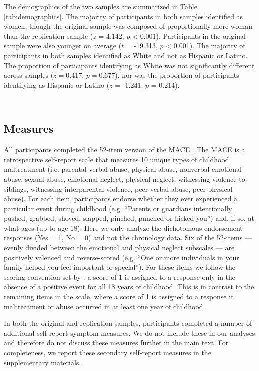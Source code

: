 \documentclass[letterpaper,man,natbib,noextraspace,floatsintext,longtable]{apa6}
\begin{document}
The demographics of the two samples are summarized in Table \ref{tab:demographics}. The majority of participants in both samples identified as women, though the original sample was composed of proportionally more woman than the replication sample ($z$ = 4.142, $p$ < 0.001). Participants in the original sample were also younger on average ($t$ = -19.313, $p$ < 0.001). The majority of participants in both samples identified as White and not as Hispanic or Latino. The proportion of participants identifying as White was not significantly different across samples ($z = 0.417$, $p = 0.677$), nor was the proportion of participants identifying as Hispanic or Latino ($z$ = -1.241, $p$ = 0.214).

{\begin{spacing}{0.2} \hfill \\ \end{spacing}} \subsection{Measures}

All participants completed the 52-item version of the MACE \citep{teicher2015maltreatment}. The MACE is a retrospective self-report scale that measures 10 unique types of childhood maltreatment (i.e. parental verbal abuse, physical abuse, nonverbal emotional abuse, sexual abuse, emotional neglect, physical neglect, witnessing violence to siblings, witnessing interparental violence, peer verbal abuse, peer physical abuse). For each item, participants endorse whether they ever experienced a particular event during childhood (e.g. ``Parents or guardians intentionally pushed, grabbed, shoved, slapped, pinched, punched or kicked you'') and, if so, at what ages (up to age 18). Here we only analyze the dichotomous endorsement responses (Yes = 1, No = 0) and not the chronology data. Six of the 52-items --- evenly divided between the emotional and physical neglect subscales --- are positively valenced and reverse-scored (e.g. ``One or more individuals in your family helped you feel important or special''). For these items we follow the scoring convention set by \cite{teicher2015maltreatment}: a score of 1 is assigned to a response only in the absence of a positive event for all 18 years of childhood. This is in contrast to the remaining items in the scale, where a score of 1 is assigned to a response if maltreatment or abuse occurred in at least one year of childhood.

In both the original and replication samples, participants completed a number of additional self-report symptom measures. We do not include these in our analyses and therefore do not discuss these measures further in the main text. For completeness, we report these secondary self-report measures in the supplementary materials. 
\end{document}
